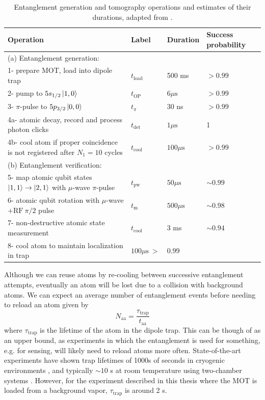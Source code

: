 \begin{table}
    \centering    
    \begin{tabular}{llll}
        \hline Operation & Label & Duration & Success probability \\
        \hline (a) Entanglement generation: & & & \\
        1- prepare MOT, load into dipole trap & $t_{\textrm{load}}$ & 500 ms & $>0.99$ \\
        2- pump to $5 s_{1 / 2}\ket{1,0}$ & $t_{\textrm{OP}}$ & $6 \mu \mathrm{s}$ & $>0.99$ \\
        3- $\pi$-pulse to $5 p_{3 / 2}\ket{0,0}$ & $t_\pi$ & 30 ns & $>0.99$ \\
        4a- atomic decay, record and process photon clicks & $t_{\text {det }}$ & $1 \mu \mathrm{s}$ & 1 \\
        4b- cool atom if proper coincidence is not registered after $N_1=10$ cycles & $t_{\textrm{cool}}$ & $100 \mu \mathrm{s}$ & $>0.99$ \\
        (b) Entanglement verification: & & & \\
        5- map atomic qubit states $\ket{1,1} \rightarrow \ket{2,1}$ with $\mu$-wave $\pi$-pulse & $t_{\textrm{pw}}$ & $50 \mu \mathrm{s}$ & $\sim 0.99$ \\
        6- atomic qubit rotation with $\mu$-wave $+\mathrm{RF}~\pi / 2$ pulse & $t_{\mathrm{m}}$ & $500 \mu \mathrm{s}$ & $\sim 0.98$ \\
        7- non-destructive atomic state measurement & $t_{\textrm{cool}}$ & 3 ms & $\sim 0.94$\cite{Kwon2017} \\
        8- cool atom to maintain localization in trap & $100 \mu \mathrm{s}~>$ &$0.99$ \\
        \hline
    \end{tabular}
    \caption{Entanglement generation and tomography operations and estimates of their durations, adapted from \cite{Young2022}.}
    \label{tab:entanglement_steps}
\end{table}
\newpage

Although we can reuse atoms by re-cooling between successive entanglement attempts, eventually an atom will be lost due to a collision with background atoms. We can expect an average number of entanglement events before needing to reload an atom given by 
\begin{equation}
    N_{\text{aa}} = \frac{\tau_{\text{trap}}}{t_{\text{aa}}}
\end{equation}
where $\tau_{\text{trap}}$ is the lifetime of the atom in the dipole trap. This can be though of as an upper bound, as experiments in which the entanglement is used for something, e.g. for sensing, will likely need to reload atoms more often. State-of-the-art experiments have shown trap lifetimes of 1000s of seconds in cryogenic environments \cite{Schymik2021}, and typically $\sim10$ s at room temperature using two-chamber systems \cite{Graham2022}. However, for the experiment described in this thesis where the MOT is loaded from a background vapor, $\tau_{\text{trap}}$ is around 2 s.

